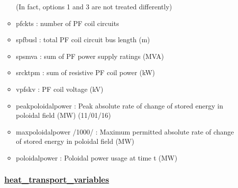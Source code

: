 \documentclass[
]{article}
\begin{document}
\begin{itemize}
\begin{itemize}
    (In fact, options 1 and 3 are not treated differently)
  \item
    pfckts : number of PF coil circuits
  \item
    spfbusl : total PF coil circuit bus length (m)
  \item
    spsmva : sum of PF power supply ratings (MVA)
  \item
    srcktpm : sum of resistive PF coil power (kW)
  \item
    vpfskv : PF coil voltage (kV)
  \item
    peakpoloidalpower : Peak absolute rate of change of stored energy in
    poloidal field (MW) (11/01/16)
  \item
    maxpoloidalpower /1000/ : Maximum permitted absolute rate of change
    of stored energy in poloidal field (MW)
  \item
    poloidalpower : Poloidal power usage at time t (MW)
  \end{itemize}

  \hypertarget{heat_transport_variables}{%
  \subsubsection{\texorpdfstring{\href{heat_transport_variables.html}{heat\_transport\_variables}}{heat\_transport\_variables}}\label{heat_transport_variables}}


\end{itemize}
\end{document}
